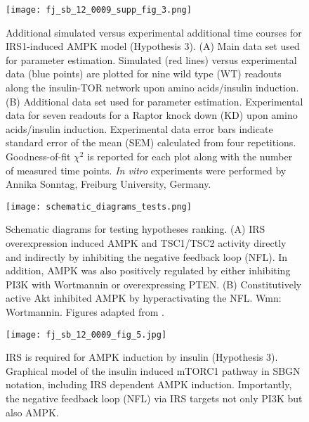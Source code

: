 \begin{figure}[tb]
	\begin{center}
		\texttt{[image: fj\_sb\_12\_0009\_supp\_fig\_3.png]}
		\caption[Additional simulated versus experimental time courses for IRS1-induced AMPK model (Hypothesis 3)]{Additional simulated versus experimental additional time courses for IRS1-induced AMPK model (Hypothesis 3). (A) Main data set used for parameter estimation. Simulated (red lines) versus experimental data (blue points) are plotted for nine wild type (WT) readouts along the insulin-TOR network upon amino acids/insulin induction. (B) Additional data set used for parameter estimation. Experimental data for seven readouts for a Raptor knock down (KD) upon amino acids/insulin induction. Experimental data error bars indicate standard error of the mean (SEM) calculated from four repetitions. Goodness-of-fit $\chi^2$ is reported for each plot along with the number of measured time points. \emph{In vitro} experiments were performed by Annika Sonntag, Freiburg University, Germany.}
		\label{fig:fj_sb_12_0009_supp_fig_3}
	\end{center}
\end{figure}
\clearpage

\begin{figure}[tb]
	\begin{center}
		\texttt{[image: schematic\_diagrams\_tests.png]}
		\caption[Schematic diagrams for testing hypotheses ranking]{Schematic diagrams for testing hypotheses ranking. (A) IRS overexpression induced AMPK and TSC1/TSC2 activity directly and indirectly by inhibiting the negative feedback loop (NFL). In addition, AMPK was also positively regulated by either inhibiting PI3K with Wortmannin or overexpressing PTEN. (B) Constitutively active Akt inhibited AMPK by hyperactivating the NFL. Wmn: Wortmannin. Figures adapted from \citep[Fig. 5A]{Sonntag2012}.}
		\label{fig:paper2_schematic_diagrams_tests}
	\end{center}
\end{figure}
\clearpage



\begin{figure}[tb]
	\begin{center}
		\texttt{[image: fj\_sb\_12\_0009\_fig\_5.jpg]}
		\caption[IRS is required for AMPK induction by insulin (Hypothesis 3)]{IRS is required for AMPK induction by insulin (Hypothesis 3). Graphical model of the insulin induced mTORC1 pathway in SBGN notation, including IRS dependent AMPK induction. Importantly, the negative feedback loop (NFL) via IRS targets not only PI3K but also AMPK.}
		\label{fig:fj_sb_12_0009_fig_5}
	\end{center}
\end{figure}
\clearpage







